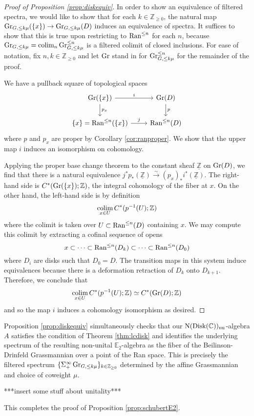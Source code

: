 \begin{proof}[Proof of Proposition \ref{prop:diskequiv}]
In order to show an equivalence of filtered spectra, we would like to show that for each $k\in \mathbb{Z}_{\geq 0}$, the natural map $\operatorname{\mathrm{Gr}}_{G,\leq k \mu}(\{ x\}) \to \operatorname{\mathrm{Gr}}_{G,\leq k\mu}(D)$ induces an equivalence of spectra.  It suffices to show that this is true upon restricting to $\operatorname{\mathrm{Ran}}^{\leq n}$ for each $n$, because $\operatorname{\mathrm{Gr}}_{G, \leq k \mu} = \operatorname*{\mathrm{colim}}_n \operatorname{\mathrm{Gr}}^{\leq n}_{G,\leq k\mu}$ is a filtered colimit of closed inclusions.  For ease of notation, fix $n,k\in \mathbb{Z}_{\geq 0}$ and let $\operatorname{\mathrm{Gr}}$ stand in for $\operatorname{\mathrm{Gr}}^{\leq n}_{G,\leq k \mu}$ for the remainder of the proof.  

We have a pullback square of topological spaces %
\begin{equation*}
\begin{tikzcd}
\Gra (\{ x\}) \arrow[r,"i"]\arrow[d,"p_x"] & \Gra (D) \arrow[d,"p"]\\
\{x \} = \Ran^{\leq n}(\{ x\} )\arrow[r,"j"] & \Ran^{\leq n}(D)
\end{tikzcd} \end{equation*}
where $p$ and $p_x$ are proper by Corollary \ref{cor:ranproper}.  We show that the upper map $i$ induces an isomorphism on cohomology.  %

Applying the proper base change theorem to the constant sheaf $\underline{\mathbb{Z}}$ on $\operatorname{\mathrm{Gr}}(D)$, we find that there is a natural equivalence $j^*p_*(\underline{\mathbb{Z}}) \xrightarrow{\sim} (p_x)_{*}i^*(\underline{\mathbb{Z}}).$  The right-hand side is $C^*(\operatorname{\mathrm{Gr}}(\{x\}) ;\mathbb{Z})$, the integral cohomology of the fiber at $x$.  On the other hand, the left-hand side is by definition $$\operatorname*{\mathrm{colim}}_{x\in U} C^*(p^{-1}(U);\mathbb{Z})$$ where the colimit is taken over $U\subset \operatorname{\mathrm{Ran}}^{\leq n}(D)$ containing $x$.  We may compute this colimit by extracting a cofinal sequence of opens $$x \subset \cdots \subset \operatorname{\mathrm{Ran}}^{\leq n}(D_k) \subset \cdots \subset \operatorname{\mathrm{Ran}}^{\leq n}(D_0)$$ where $D_i$ are disks such that $D_0=D$.  The transition maps in this system induce equivalences because there is a deformation retraction of $D_k$ onto $D_{k+1}$.  Therefore, we conclude that $$\operatorname*{\mathrm{colim}}_{x\in U} C^*(p^{-1}(U);\mathbb{Z}) \simeq C^*(\operatorname{\mathrm{Gr}}(D); \mathbb{Z})$$ and so the map $i$ induces a cohomology isomorphism as desired.  
\end{proof} 

Proposition \ref{prop:diskequiv} simultaneously checks that our $\operatorname{\mathrm{N}} (\mathrm{Disk}(\mathbb{C}))_{\mathrm{nu}}$-algebra $A$ satisfies the condition of Theorem \ref{thm:lcdisk} and identifies the underlying spectrum of the resulting non-unital $\mathbb{E}_2$-algebra as the fiber of the Beilinson-Drinfeld Grassmannian over a point of the Ran space.  This is precisely the filtered spectrum $\{ \Sigma^{\infty}_+ \operatorname{\mathrm{Gr}}_{G,\leq k\mu}\}_{k \in \mathbb{Z}_{\geq 0}}$ determined by the affine Grassmannian and choice of coweight $\mu$.  

***insert some stuff about unitality***

This completes the proof of Proposition \ref{prop:schubertE2}.  
